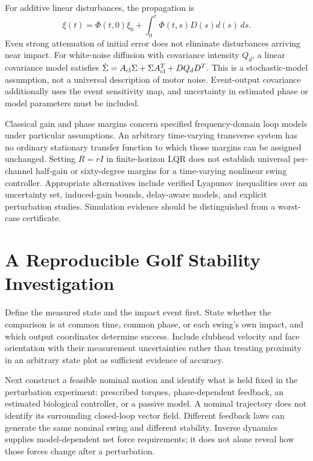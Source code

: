 For additive linear disturbances, the propagation is
\begin{equation}\label{eq:orbital_disturbance}
 \xi(t)=\Phi(t,0)\xi_0+
       \int_0^t\Phi(t,s)D(s)d(s)\,ds.
\end{equation}
Even strong attenuation of initial error does not eliminate disturbances
arriving near impact. For white-noise diffusion with covariance intensity
$Q_d$, a linear covariance model satisfies
$\dot\Sigma=A_{\rm cl}\Sigma+\Sigma A_{\rm cl}^T+DQ_dD^T$.
This is a stochastic-model assumption, not a universal description of motor
noise. Event-output covariance additionally uses the event sensitivity map,
and uncertainty in estimated phase or model parameters must be included.

Classical gain and phase margins concern specified frequency-domain loop
models under particular assumptions. An arbitrary time-varying transverse
system has no ordinary stationary transfer function to which those margins
can be assigned unchanged. Setting $R=rI$ in finite-horizon LQR does not
establish universal per-channel half-gain or sixty-degree margins for a
time-varying nonlinear swing controller. Appropriate alternatives include
verified Lyapunov inequalities over an uncertainty set, induced-gain bounds,
delay-aware models, and explicit perturbation studies. Simulation evidence
should be distinguished from a worst-case certificate.

\section{A Reproducible Golf Stability Investigation}

Define the measured state and the impact event first. State whether the
comparison is at common time, common phase, or each swing's own impact, and
which output coordinates determine success. Include clubhead velocity and
face orientation with their measurement uncertainties rather than treating
proximity in an arbitrary state plot as sufficient evidence of accuracy.

Next construct a feasible nominal motion and identify what is held fixed in
the perturbation experiment: prescribed torques, phase-dependent feedback,
an estimated biological controller, or a passive model. A nominal trajectory
does not identify its surrounding closed-loop vector field. Different
feedback laws can generate the same nominal swing and different stability.
Inverse dynamics supplies model-dependent net force requirements; it does
not alone reveal how those forces change after a perturbation.

